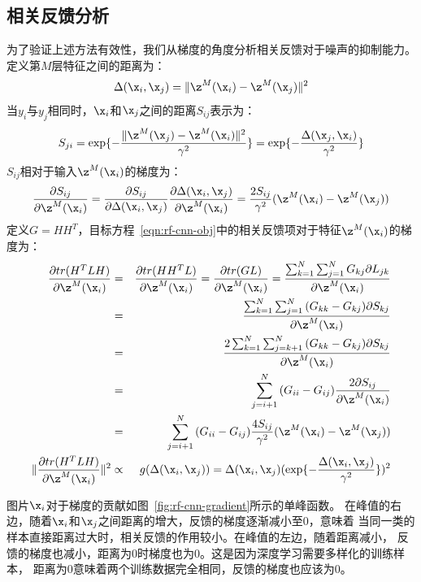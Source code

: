 \subsection{相关反馈分析}
为了验证上述方法有效性，我们从梯度的角度分析相关反馈对于噪声的抑制能力。
定义第$M$层特征之间的距离为：
\begin{eqnarray}
    \Delta(\x_i, \x_j) = \|\z^M(\x_i) - \z^M(\x_j)\|^2
\end{eqnarray}
当$y_i$与$y_j$相同时，$\x_i$和$\x_j$之间的距离$S_{ij}$表示为：
\begin{eqnarray}
    S_{ji}
    = \exp\{-\frac{\|\z^M(\x_j) - \z^M(\x_i)\|^2}{\gamma^2}\}
    = \exp\{-\frac{\Delta(\x_j, \x_i)}{\gamma^2}\}
\end{eqnarray}
$S_{ij}$相对于输入$\z^M(\x_i)$的梯度为：
\begin{eqnarray}
    \frac{\partial S_{ij}}{\partial \z^M(\x_i)} =
    \frac{\partial S_{ij}}{\partial \Delta(\x_i, \x_j)}
    \frac{\partial \Delta(\x_i, \x_j)}{\partial \z^M(\x_i)} =
    \frac{2S_{ij}}{\gamma^2}(\z^M(\x_i) - \z^M(\x_j))
\end{eqnarray}
定义$G=HH^T$，目标方程~\eqref{eqn:rf-cnn-obj}中的相关反馈项对于特征$\z^M(\x_i)$的梯度为：
\begin{eqnarray*}
    \frac{\partial tr(H^TLH)}{\partial \z^M(\x_i)} &=&
    \frac{\partial tr(HH^TL)}{\partial \z^M(\x_i)} =
    \frac{\partial tr(GL)}{\partial \z^M(\x_i)}
    =\frac{\sum_{k=1}^N\sum_{j=1}^N{G_{kj}\partial L_{jk}}}{\partial \z^M(\x_i)} \\
    &=&\frac{\sum_{k=1}^N\sum_{j=1}^N{(G_{kk} - G_{kj})\partial S_{kj}}}{\partial \z^M(\x_i)}  \\ 
    &=&\frac{2\sum_{k=1}^N\sum_{j=k+1}^N{(G_{kk} - G_{kj})\partial S_{kj}}}{\partial \z^M(\x_i)}  \\ 
    &=&\sum_{j=i+1}^N{(G_{ii} - G_{ij})}\frac{2\partial S_{ij}}{\partial \z^M(\x_i)}  \\ 
    &=&\sum_{j=i+1}^N{(G_{ii} - G_{ij})\frac{4S_{ij}}{\gamma^2}(\z^M(\x_i) - \z^M(\x_j))}  \\ 
    \|\frac{\partial tr(H^TLH)}{\partial \z^M(\x_i)}\|^2 &\propto&
    g(\Delta(\x_i, \x_j)) = \Delta(\x_i, \x_j)(\exp\{-\frac{\Delta(\x_i, \x_j)}{\gamma^2}\})^2
\end{eqnarray*}

图片$\x_i$对于梯度的贡献如图~\ref{fig:rf-cnn-gradient}所示的单峰函数。
在峰值的右边，随着$\x_i$和$\x_j$之间距离的增大，反馈的梯度逐渐减小至0，意味着
当同一类的样本直接距离过大时，相关反馈的作用较小。在峰值的左边，随着距离减小，
反馈的梯度也减小，距离为0时梯度也为0。这是因为深度学习需要多样化的训练样本，
距离为0意味着两个训练数据完全相同，反馈的梯度也应该为0。

